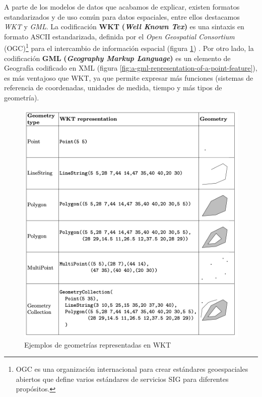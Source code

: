A parte de los modelos de datos que acabamos de explicar, existen formatos estandarizados y de uso común para datos espaciales, entre ellos destacamos \textit{WKT} y \textit{GML}. La codificación \textbf{WKT} \textbf{(\textit{Well Known Tex})} es una sintaxis en formato ASCII estandarizada, definida por el \textit{Open Geospatial Consortium} (OGC)\footnote{OGC es una organización internacional para crear estándares geoespaciales abiertos que define varios estándares de servicios SIG para diferentes propósitos.} para el intercambio de información espacial (figura \ref{fig:wkt}) \cite{wkt}. Por otro lado, la codificación \textbf{GML} \textbf{(\textit{Geography Markup Language})} es un elemento de Geografía codificado en XML (figura \ref{fig:a-gml-representation-of-a-point-feature}), es más ventajoso que WKT, ya que permite expresar más funciones (sistemas de referencia de coordenadas, unidades de medida, tiempo y más tipos de geometría). 

\begin{figure}[H]
	\centering
	\includegraphics[width=0.82\linewidth]{imagenes/capitulo2/wkt}
	\caption{Ejemplos de geometrías representadas en WKT}
	\label{fig:wkt}
\end{figure}

